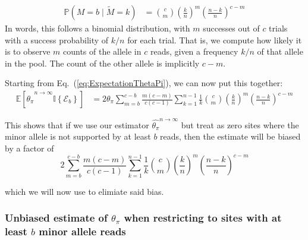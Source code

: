 \documentclass[a4paper,fontsize=9pt,DIV=14]{scrartcl}
\newcounter{todo}
\newcommand\todo[1]{{\stepcounter{todo}\color{purple}{TODO \arabic{todo}: #1}}}
\newcommand\eqnref[1]{Eq.~(\ref{#1})}
\newcommand{\samplesize}{n}
\newcommand{\coverage}{c}
\newcommand{\thetapi}{\widehat{\theta_\pi}}
\begin{document}
%
\begin{align}
    \label{eq:Pmcnk}
     \mathbb{P}\left(M=b \mid \widetilde{M} = k\right) &= \binom{\coverage}{m} \left(\frac{k}{\samplesize}\right)^m \left(\frac{\samplesize-k}{\samplesize}\right)^{\coverage-m}
\end{align}
%
In words, this follows a binomial distribution, with $m$ successes out of $c$ trials
with a success probability of $k/n$ for each trial.
That is, we compute how likely it is to observe $m$ counts of the allele in $c$ reads,
given a frequency $k/n$ of that allele in the pool.
The count of the other allele is implicitly $c-m$.

Starting from \eqnref{eq:ExpectationThetaPi}, we can now put this together:
%
\begin{align}
\nonumber
\mathbb{E}\left[\thetapi^{\samplesize\to\infty} \mathbb{I}\left\{\mathcal{E}_b\right\}\right]  &=2\theta_\pi \sum_{m=b}^{\coverage-b} \frac{m(\coverage-m)}{\coverage(\coverage-1)} \sum_{k=1}^{n-1} \frac{1}{k} \binom{\coverage}{m} \left(\frac{k}{\samplesize}\right)^m \left(\frac{\samplesize-k}{\samplesize}\right)^{\coverage-m}
\end{align}

This shows that if we use our estimator $\thetapi^{\samplesize\to\infty}$ but treat as zero sites where the minor allele is not supported by at least $b$ reads, then the estimate will be biased by a factor of
\[
2\sum_{m=b}^{\coverage-b} \frac{m(\coverage-m)}{\coverage(\coverage-1)} \sum_{k=1}^{n-1} \frac{1}{k} \binom{\coverage}{m} \left(\frac{k}{\samplesize}\right)^m \left(\frac{\samplesize-k}{\samplesize}\right)^{\coverage-m}
\]

which we will now use to elimiate said bias.




\subsubsection*{Unbiased estimate of $\theta_\pi$ when restricting to sites with at least $b$ minor allele reads}
\label{supp:sec:ThetaPi:sub:PoolSequencing:sub:FinalApprox}
\end{document}
